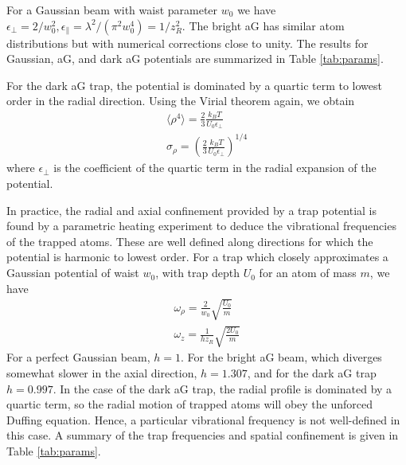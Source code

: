 For a Gaussian beam with waist parameter $w_0$ we have $\epsilon_{\perp}=2 / w_0^{2}, \epsilon_{\|}=\lambda^{2}/(\pi^{2} w_0^{4}) = 1/z_R^2$. The bright aG has similar atom distributions but with numerical corrections close to unity. The results for Gaussian, aG, and dark aG potentials are summarized in Table \ref{tab:params}.

For the dark aG trap, the potential is dominated by a quartic term to lowest order in the radial direction. Using the Virial theorem again, we obtain 
\begin{equation}
    \begin{gathered}
    \langle \rho^4 \rangle = \frac{2}{3}\frac{k_B T}{U_0 \epsilon_{\perp}}\\
    \sigma_{\rho} = \left(\frac{2}{3}\frac{k_B T}{U_0 \epsilon_{\perp}} \right)^{1/4}
    \end{gathered}
\end{equation}
where $\epsilon_{\perp}$ is the coefficient of the quartic term in the radial expansion of the potential.

In practice, the radial and axial confinement provided by a trap potential is found by a parametric heating experiment to deduce the vibrational frequencies of the trapped atoms. These are well defined along directions for which the potential is harmonic to lowest order. For a trap which closely approximates a Gaussian potential of waist $w_0$, with trap depth $U_0$ for an atom of mass $m$, we have 
\begin{equation}\label{eq:harmonic_freqs}
    \begin{gathered}
    \omega_{\rho} = \frac{2}{w_0}\sqrt{\frac{U_0}{m}}\\
    \omega_z = \frac{1}{h z_R}\sqrt{\frac{2 U_0}{m}}
    \end{gathered}
\end{equation}
For a perfect Gaussian beam, $h=1$. For the bright aG beam, which diverges somewhat slower in the axial direction, $h=1.307$, and for the dark aG trap $h=0.997$. In the case of the dark aG trap, the radial profile is dominated by a quartic term, so the radial motion of trapped atoms will obey the unforced Duffing equation\cite{Kovacic2011}. Hence, a particular vibrational frequency is not well-defined in this case. A summary of the trap frequencies and spatial confinement is given in Table \ref{tab:params}.

